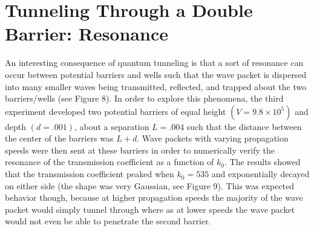 \documentclass[twocolumn]{article}
\begin{document}
\section{Tunneling Through a Double Barrier: Resonance}
\hspace{\parindent}An interesting consequence of quantum tunneling is that a sort of resonance can occur between potential barriers and wells such that the wave packet is dispersed into many smaller waves being transmitted, reflected, and trapped about the two barriers/wells (see Figure 8). In order to explore this phenomena, the third experiment developed two potential barriers of equal height $(V=9.8\times10^5)$ and depth $(d=.001)$, about a separation $L=.004$ such that the distance between the center of the barriers was $L+d$. Wave packets with varying propagation speeds were then sent at these barriers in order to numerically verify the resonance of the transmission coefficient as a function of $k_0$. The results showed that the transmission coefficient peaked when $k_0=535$ and exponentially decayed on either side (the shape was very Gaussian, see Figure 9). This was expected behavior though, because at higher propagation speeds the majority of the wave packet would simply tunnel through where as at lower speeds the wave packet would not even be able to penetrate the second barrier.
\end{document}

